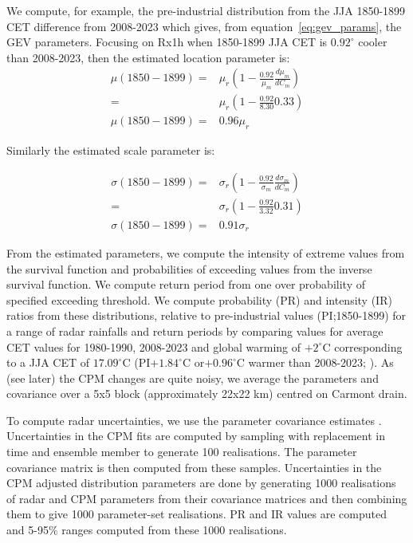 \documentclass[11pt,a4paper]{article}
\begin{document}
We compute, for example, the pre-industrial distribution from  the  JJA 1850-1899 CET difference from 2008-2023  which gives, from equation~\ref{eq:gev_params}, the GEV parameters. Focusing  on Rx1h when 1850-1899 JJA CET is $0.92^\circ$ cooler than 2008-2023, then the estimated location parameter is:
 \begin{align*}
 \mu(1850-1899) =& \mu_r \left( 1 - \frac{0.92}{\mu_m} \frac{d\mu_m}{dC_m}\right) \\
   =&  \mu_r \left( 1 - \frac{0.92}{8.30} 0.33\right)\\
  \mu(1850-1899) = &0.96\mu_r
 	\end{align*}
 
 Similarly the estimated scale parameter is:
 
 \begin{align*}
	\sigma(1850-1899) =& \sigma_r \left( 1 - \frac{0.92}{\sigma_m} \frac{d\sigma_m}{dC_m}\right) \\
	=&  \sigma_r \left( 1 -  \frac{0.92}{3.32} 0.31\right)\\
	\sigma(1850-1899) = &0.91\sigma_r
\end{align*}

 From the estimated parameters, we compute the intensity of  extreme values from the survival function and probabilities of exceeding values  from the  inverse survival function. We compute return period from one over probability of specified exceeding threshold. We compute probability (PR) and intensity (IR) ratios from these distributions, relative to pre-industrial values (PI;1850-1899) for a range of radar rainfalls and return periods by comparing values for average CET values for 1980-1990, 2008-2023 and global warming of $+2^\circ$C corresponding to a JJA CET of $17.09^\circ$C (PI$+1.84^\circ$C or$+0.96^\circ$C warmer than 2008-2023; \cite{tett2023edinburgh}). As (see later) the CPM changes are quite noisy, we average the parameters and covariance over a 5x5 block (approximately 22x22 km) centred on Carmont drain.

To compute radar uncertainties, we use the parameter covariance  estimates \parencite{gilleland2016extremes}. Uncertainties in the CPM fits are computed by sampling with replacement\parencite{Efron1994bootstrap} in time and ensemble member  to generate 100 realisations. The parameter covariance matrix is then computed from these samples. Uncertainties in the CPM adjusted distribution parameters are done by generating 1000 realisations of radar and CPM parameters from their covariance matrices and then  combining them to give 1000 parameter-set realisations. PR and IR values are computed and 5-95\% ranges computed from these 1000 realisations. 
\end{document}
